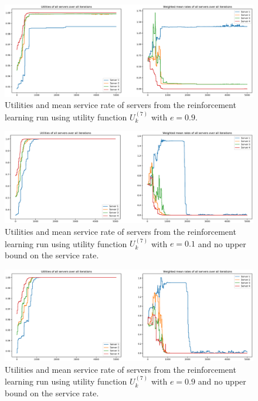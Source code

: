 \begin{figure}[H]
    \includegraphics[width=\textwidth]{chapters/00_appendix/03_more_rl_results/Bin/utility_7_eps/u7_4_e09.eps}
    \caption{Utilities and mean service rate of servers from the reinforcement
    learning run using utility function \(U_k^{(7)}\) with \(e = 0.9\).}
    \label{fig:RL_utility7_4_e09}
\end{figure}



\begin{figure}[H]
    \includegraphics[width=\textwidth]{chapters/00_appendix/03_more_rl_results/Bin/utility_7_eps/u7_5_no_max_e01.eps}
    \caption{Utilities and mean service rate of servers from the reinforcement
    learning run using utility function \(U_k^{(7)}\) with \(e = 0.1\) and no
    upper bound on the service rate.}
    \label{fig:RL_utility7_5_no_max_e01}
\end{figure}


\begin{figure}[H]
    \includegraphics[width=\textwidth]{chapters/00_appendix/03_more_rl_results/Bin/utility_7_eps/u7_5_no_max_e09.eps}
    \caption{Utilities and mean service rate of servers from the reinforcement
    learning run using utility function \(U_k^{(7)}\) with \(e = 0.9\) and no
    upper bound on the service rate.}
    \label{fig:RL_utility7_5_no_max_e09}
\end{figure}



